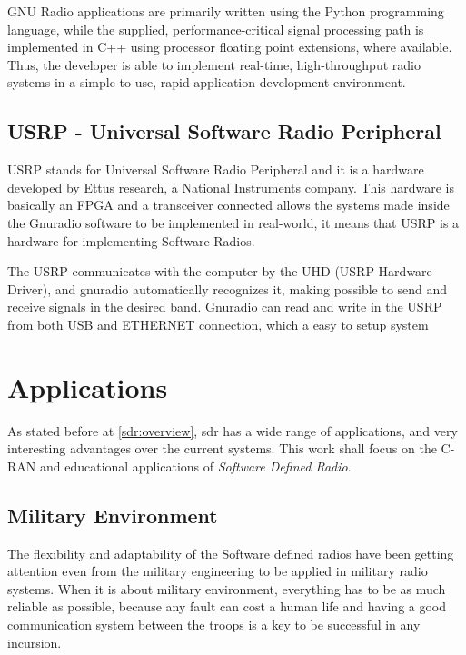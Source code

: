 GNU Radio applications are primarily written using the Python programming
language, while the supplied, performance-critical signal processing path is
implemented in C++ using processor floating point extensions, where available.
Thus, the developer is able to implement real-time, high-throughput radio
systems in a simple-to-use, rapid-application-development environment.\\

\subsection{USRP - Universal Software Radio Peripheral}

USRP stands for Universal Software Radio Peripheral and it is a hardware
developed by Ettus research, a National Instruments company. This hardware is
basically an FPGA and a transceiver connected allows the systems made inside the
Gnuradio software to be implemented in real-world, it means that USRP is a
hardware for implementing Software Radios.

The USRP communicates with the computer by the UHD (USRP Hardware Driver), and
gnuradio automatically recognizes it, making possible to send and receive
signals in the desired band. Gnuradio can read and write in the USRP from both
USB and ETHERNET connection, which a easy to setup system


\section{Applications}
\label{sec:sdr_app}

As stated before  at \ref{sdr:overview}, sdr has a wide range of applications,
and very interesting advantages over the current systems. This work shall focus
on the C-RAN and educational applications of \emph{Software Defined Radio}.

\subsection{Military Environment}

The flexibility and adaptability of the Software defined radios have been
getting attention even from the military engineering to be applied in military
radio systems. When it is about military environment, everything has to be as
much reliable as possible, because any fault can cost a human life and having a
good communication system between the troops is a key to be successful in any
incursion.\\

